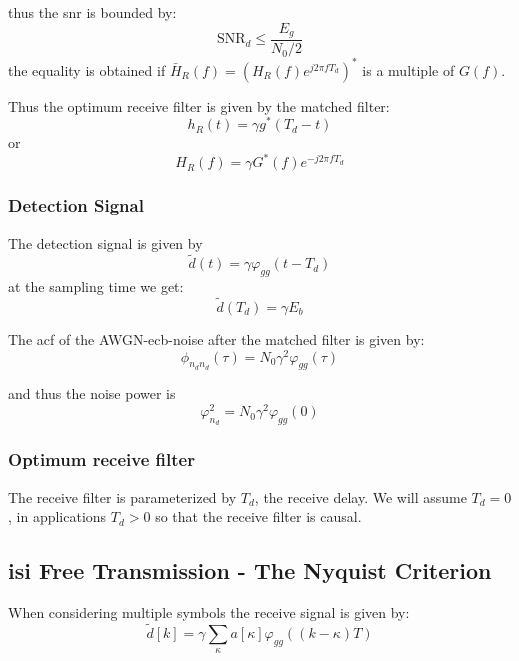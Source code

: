 thus the \ac{snr} is bounded by:
\begin{equation}
    \text{SNR}_d \leq \frac{E_g}{N_0/2}
\end{equation}
the equality is obtained if $\bar{H}_R(f) = {(H_R(f) e^{j 2 \pi f T_d})}^*$ is a multiple
of $G(f)$.

Thus the optimum receive filter is given by the matched filter:
\begin{equation}
    h_R(t) = \gamma g^*(T_d -t)
\end{equation}
or
\begin{equation}
    H_R(f) = \gamma G^*(f) e^{-j 2 \pi f T_d}
\end{equation}

\subsubsection{Detection Signal}
The detection signal is given by
\begin{equation}
    \tilde{d}(t) = \gamma \varphi_{gg}(t- T_d)
\end{equation}
at the sampling time we get:
\begin{equation}
    \tilde{d}(T_d) = \gamma E_b
\end{equation}

The \ac{acf} of the AWGN-\ac{ecb}-noise after the matched filter is given by:
\begin{equation}
    \phi_{n_d n_d}(\tau) = N_0 \gamma^2 \varphi_{gg}(\tau)
\end{equation}

and thus the noise power is
\begin{equation}
    \varphi_{n_d}^2 = N_0 \gamma^2 \varphi_{gg}(0)
\end{equation}

\subsubsection{Optimum receive filter}
The receive filter is parameterized by $T_d$, the receive delay. We will assume $T_d=0$,
in applications $T_d > 0$ so that the receive filter is causal.

\subsection{\acl{isi} Free Transmission - The Nyquist Criterion}
When considering multiple symbols the receive signal is given by:
\begin{equation}
    \tilde{d}[k] = \gamma \sum_\kappa a[\kappa] \varphi_{gg}((k - \kappa) T)
\end{equation}

